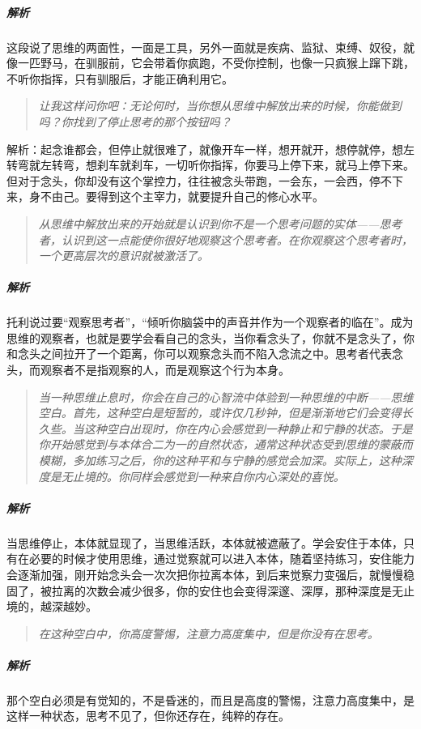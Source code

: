 \subparagraph{解析} 这段说了思维的两面性，一面是工具，另外一面就是疾病、监狱、束缚、奴役，就像一匹野马，在驯服前，它会带着你疯跑，不受你控制，也像一只疯猴上蹿下跳，不听你指挥，只有驯服后，才能正确利用它。

\begin{quote}\it
    让我这样问你吧：无论何时，当你想从思维中解放出来的时候，你能做到吗？你找到了停止思考的那个按钮吗？
\end{quote}

解析：起念谁都会，但停止就很难了，就像开车一样，想开就开，想停就停，想左转弯就左转弯，想刹车就刹车，一切听你指挥，你要马上停下来，就马上停下来。但对于念头，你却没有这个掌控力，往往被念头带跑，一会东，一会西，停不下来，身不由己。要得到这个主宰力，就要提升自己的修心水平。

\begin{quote}\it
    从思维中解放出来的开始就是认识到你不是一个思考问题的实体——思考者，认识到这一点能使你很好地观察这个思考者。在你观察这个思考者时，一个更高层次的意识就被激活了。
\end{quote}

\subparagraph{解析} 托利说过要“观察思考者”，“倾听你脑袋中的声音并作为一个观察者的临在”。成为思维的观察者，也就是要学会看自己的念头，当你看念头了，你就不是念头了，你和念头之间拉开了一个距离，你可以观察念头而不陷入念流之中。思考者代表念头，而观察者不是指观察的人，而是观察这个行为本身。

\begin{quote}\it
    当一种思维止息时，你会在自己的心智流中体验到一种思维的中断——思维空白。首先，这种空白是短暂的，或许仅几秒钟，但是渐渐地它们会变得长久些。当这种空白出现时，你在内心会感觉到一种静止和宁静的状态。于是你开始感觉到与本体合二为一的自然状态，通常这种状态受到思维的蒙蔽而模糊，多加练习之后，你的这种平和与宁静的感觉会加深。实际上，这种深度是无止境的。你同样会感觉到一种来自你内心深处的喜悦。
\end{quote}

\subparagraph{解析} 当思维停止，本体就显现了，当思维活跃，本体就被遮蔽了。学会安住于本体，只有在必要的时候才使用思维，通过觉察就可以进入本体，随着坚持练习，安住能力会逐渐加强，刚开始念头会一次次把你拉离本体，到后来觉察力变强后，就慢慢稳固了，被拉离的次数会减少很多，你的安住也会变得深邃、深厚，那种深度是无止境的，越深越妙。

\begin{quote}\it
    在这种空白中，你高度警惕，注意力高度集中，但是你没有在思考。
\end{quote}

\subparagraph{解析} 那个空白必须是有觉知的，不是昏迷的，而且是高度的警惕，注意力高度集中，是这样一种状态，思考不见了，但你还存在，纯粹的存在。

